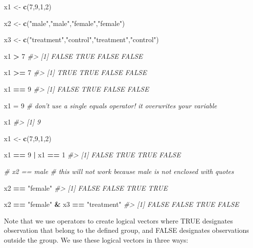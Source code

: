 \documentclass[]{book}
\newenvironment{Shaded}{\begin{snugshade}}{\end{snugshade}}
\newcommand{\CommentTok}[1]{\textcolor[rgb]{0.56,0.35,0.01}{\textit{#1}}}
\newcommand{\DecValTok}[1]{\textcolor[rgb]{0.00,0.00,0.81}{#1}}
\newcommand{\KeywordTok}[1]{\textcolor[rgb]{0.13,0.29,0.53}{\textbf{#1}}}
\newcommand{\NormalTok}[1]{#1}
\newcommand{\OperatorTok}[1]{\textcolor[rgb]{0.81,0.36,0.00}{\textbf{#1}}}
\newcommand{\StringTok}[1]{\textcolor[rgb]{0.31,0.60,0.02}{#1}}
\theoremstyle{definition}
\theoremstyle{definition}
\theoremstyle{definition}
\theoremstyle{remark}
\begin{document}
\begin{Shaded}
\begin{Highlighting}[]


\NormalTok{x1 <-}\StringTok{ }\KeywordTok{c}\NormalTok{(}\DecValTok{7}\NormalTok{,}\DecValTok{9}\NormalTok{,}\DecValTok{1}\NormalTok{,}\DecValTok{2}\NormalTok{)}

\NormalTok{x2 <-}\StringTok{ }\KeywordTok{c}\NormalTok{(}\StringTok{"male"}\NormalTok{,}\StringTok{"male"}\NormalTok{,}\StringTok{"female"}\NormalTok{,}\StringTok{"female"}\NormalTok{)}

\NormalTok{x3 <-}\StringTok{ }\KeywordTok{c}\NormalTok{(}\StringTok{"treatment"}\NormalTok{,}\StringTok{"control"}\NormalTok{,}\StringTok{"treatment"}\NormalTok{,}\StringTok{"control"}\NormalTok{)}

\NormalTok{x1 }\OperatorTok{>}\StringTok{ }\DecValTok{7}
\CommentTok{#> [1] FALSE  TRUE FALSE FALSE}

\NormalTok{x1 }\OperatorTok{>=}\StringTok{ }\DecValTok{7}
\CommentTok{#> [1]  TRUE  TRUE FALSE FALSE}

\NormalTok{x1 }\OperatorTok{==}\StringTok{ }\DecValTok{9}
\CommentTok{#> [1] FALSE  TRUE FALSE FALSE}

\NormalTok{x1 =}\StringTok{ }\DecValTok{9}  \CommentTok{# don't use a single equals operator!  it overwrites your variable}

\NormalTok{x1}
\CommentTok{#> [1] 9}

\NormalTok{x1 <-}\StringTok{ }\KeywordTok{c}\NormalTok{(}\DecValTok{7}\NormalTok{,}\DecValTok{9}\NormalTok{,}\DecValTok{1}\NormalTok{,}\DecValTok{2}\NormalTok{)}

\NormalTok{x1 }\OperatorTok{==}\StringTok{ }\DecValTok{9} \OperatorTok{|}\StringTok{ }\NormalTok{x1 }\OperatorTok{==}\StringTok{ }\DecValTok{1}
\CommentTok{#> [1] FALSE  TRUE  TRUE FALSE}

\CommentTok{# x2 == male  # this will not work because male is not enclosed with quotes}

\NormalTok{x2 }\OperatorTok{==}\StringTok{ "female"}
\CommentTok{#> [1] FALSE FALSE  TRUE  TRUE}

\NormalTok{x2 }\OperatorTok{==}\StringTok{ "female"} \OperatorTok{&}\StringTok{ }\NormalTok{x3 }\OperatorTok{==}\StringTok{ "treatment"}
\CommentTok{#> [1] FALSE FALSE  TRUE FALSE}
\end{Highlighting}
\end{Shaded}

Note that we use operators to create logical vectors where TRUE
designates observation that belong to the defined group, and FALSE
designates observations outside the group. We use these logical vectors
in three ways:
\end{document}
